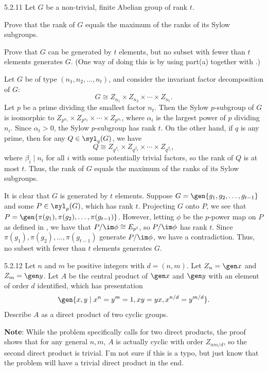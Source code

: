 \begin{exercise}{5.2.11}
    Let $G$ be a non-trivial, finite Abelian group of rank $t$.
    \begin{subexercises}
        \item Prove that the rank of $G$ equals the maximum of the ranks of its Sylow subgroups.
        \item Prove that $G$ can be generated by $t$ elements, but no subset with fewer than $t$ elements generates $G$. (One way of doing this is by using part(a) together with .)
    \end{subexercises}
\end{exercise}

\begin{solenum}
    \item Let $G$ be of type $(n_1, n_2, \ldots, n_t)$, and consider the invariant factor decomposition of $G$:
    \[
    	G \cong Z_{n_1} \times Z_{n_2} \times \cdots \times Z_{n_t}.
    \]
    Let $p$ be a prime dividing the smallest factor $n_t$.
	Then the Sylow $p$-subgroup of $G$ is isomorphic to $Z_{p^{\alpha_1}} \times Z_{p^{\alpha_2}} \times \cdots \times Z_{p^{\alpha_t}}$, where $\alpha_i$ is the largest power of $p$ dividing $n_i$.
	Since $\alpha_t > 0$, the Sylow $p$-subgroup has rank $t$.
	On the other hand, if $q$ is any prime, then for any $Q \in \syl_q(G)$, we have
    \[
    	Q \cong Z_{q^{\beta_1}} \times Z_{q^{\beta_2}} \times \cdots \times Z_{q^{\beta_t}},
    \]
    where $\beta_i \mid n_i$ for all $i$ with some potentially trivial factors, so the rank of $Q$ is at most $t$.
	Thus, the rank of $G$ equals the maximum of the ranks of its Sylow subgroups.
    \item It is clear that $G$ is generated by $t$ elements.
	Suppose $G = \gen{g_1, g_2, \ldots, g_{t-1}}$ and some $P \in \syl_p(G)$, which has rank $t$.
	Projecting $G$ onto $P$, we see that $P = \gen{\pi(g_1), \pi(g_2), \ldots, \pi(g_{t-1})}$.
	However, letting $\phi$ be the $p$-power map on $P$ as defined in , we have that $P/\im\phi \cong E_{p^t}$, so $P/\im\phi$ has rank $t$.
	Since $\pi(g_1), \pi(g_2), \ldots, \pi(g_{t-1})$ generate $P/\im\phi$, we have a contradiction.
	Thus, no subset with fewer than $t$ elements generates $G$.
\end{solenum}

\begin{spex}{5.2.12}
    Let $n$ and $m$ be positive integers with $d = (n, m)$.
	Let $Z_n = \gen x$ and $Z_m = \gen y$.
	Let $A$ be the central product of $\gen x$ and $\gen y$ with an element of order $d$ identified, which has presentation
    \[
    	\gen{x, y \mid x^n = y^m = 1, xy = yx, x^{n/d} = y^{m/d}}.
    \]
    Describe $A$ as a direct product of two cyclic groups.
    
    \noindent\textbf{Note}: While the problem specifically calls for two direct products, the proof shows that for any general $n, m$, $A$ is actually cyclic with order $Z_{nm/d}$, so the second direct product is trivial.
	I'm not sure if this is a typo, but just know that the problem will have a trivial direct product in the end.
\end{spex}

